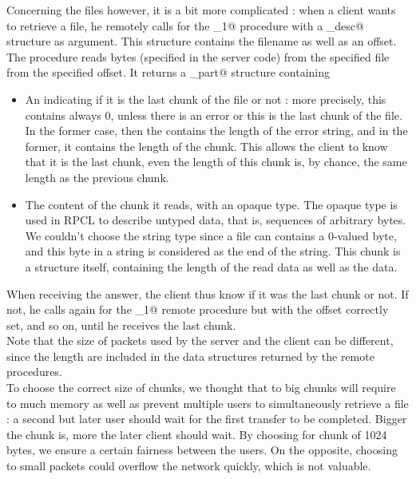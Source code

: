 \documentclass{article}
\begin{document}
Concerning the files however, it is a bit more complicated : when a client wants to retrieve a file, he remotely calls for the \verb@rget_1@ procedure with a \verb@file_desc@ structure as argument. This structure contains the filename as well as an offset. The procedure reads \verb@PSIZE@ bytes (specified in the server code) from the specified file from the specified offset. It returns a \verb@file_part@ structure containing 
\begin{itemize}
\item An \verb@int@ indicating if it is the last chunk of the file or not : more precisely, this \verb@int@ contains always 0, unless there is an error or this is the last chunk of the file. In the former case, then the \verb@int@ contains the length of the error string, and in the former, it contains the length of the chunk. This allows the client to know that it is the last chunk, even the length of this chunk is, by chance, the same length as the previous chunk.
\item The content of the chunk it reads, with an opaque type. The opaque type is used in RPCL to describe untyped data, that is, sequences of arbitrary bytes. We couldn't choose the string type since a file can contains a 0-valued byte, and this byte in a string is considered as the end of the string. This chunk is a structure itself, containing the length of the read data as well as the data.
\end{itemize}

When receiving the answer, the client thus know if it was the last chunk or not. If not, he calls again for the 
 \verb@rget_1@ remote procedure but with the offset correctly set, and so on, until he receives the last chunk.\\
 
Note that the size of packets used by the server and the client can be different, since the length are included in the data structures returned by the remote procedures.\\

To choose the correct size of chunks, we thought that to big chunks will require to much memory as well as prevent multiple users to simultaneously retrieve a file : a second but later user should wait for the first transfer to be completed. Bigger the chunk is, more the later client should wait. By choosing for chunk of 1024 bytes, we ensure a certain fairness between the users. On the opposite, choosing to small packets could overflow the network quickly, which is not valuable.
 
\end{document}
